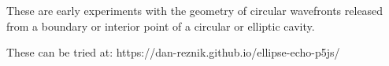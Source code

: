 These are early experiments with the geometry of circular wavefronts released from a boundary or interior point of a circular or elliptic cavity.

These can be tried at: https://dan-reznik.github.io/ellipse-echo-p5js/